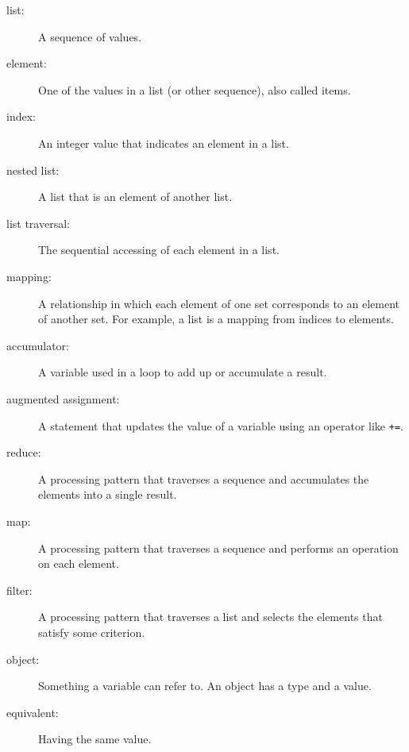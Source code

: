 \documentclass[10pt]{book}
\begin{document}
\begin{description}

\item[list:] A sequence of values.

\item[element:] One of the values in a list (or other sequence),
also called items.

\item[index:] An integer value that indicates an element in a list.

\item[nested list:] A list that is an element of another list.

\item[list traversal:] The sequential accessing of each element in a list.

\item[mapping:] A relationship in which each element of one set
corresponds to an element of another set.  For example, a list is
a mapping from indices to elements.

\item[accumulator:] A variable used in a loop to add up or
accumulate a result.

\item[augmented assignment:] A statement that updates the value
of a variable using an operator like \verb"+=".

\item[reduce:] A processing pattern that traverses a sequence 
and accumulates the elements into a single result.

\item[map:] A processing pattern that traverses a sequence and
performs an operation on each element.

\item[filter:] A processing pattern that traverses a list and
selects the elements that satisfy some criterion.

\item[object:] Something a variable can refer to.  An object
has a type and a value.

\item[equivalent:] Having the same value.


\end{description}
\end{document}
